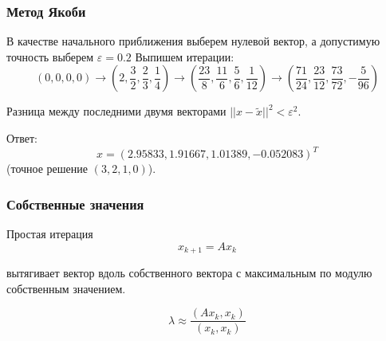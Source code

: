 \documentclass[10pt]{beamer}
\begin{document}
\begin{frame}[fragile]
\frametitle{Метод Якоби}
В качестве начального приближения выберем нулевой вектор, а допустимую точность выберем $\varepsilon = 0.2$ Выпишем итерации:
$$
(0, 0, 0, 0)  \rightarrow
\left( 2, \frac{3}{2}, \frac{2}{3}, \frac{1}{4} \right) \rightarrow
\left( \frac{23}{8}, \frac{11}{6}, \frac{5}{6}, \frac{1}{12} \right) \rightarrow
\left( \frac{71}{24}, \frac{23}{12}, \frac{73}{72}, -\frac{5}{96} \right)
$$

Разница между последними двумя векторами $||x - \tilde{x}||^2 < \varepsilon^2$. 

Ответ: 
$$x = (2.95833, 1.91667, 1.01389, -0.052083)^T$$
(точное решение $(3, 2, 1, 0)$).

\end{frame}




\begin{frame}[fragile]
\frametitle{Собственные значения}

Простая итерация
$$x_{k+1} = A x_k$$

вытягивает вектор вдоль собственного вектора с максимальным по модулю собственным значением.

$$ \lambda \approx \frac{(Ax_k, x_k)}{(x_k, x_k)}$$

\end{frame}
\end{document}
